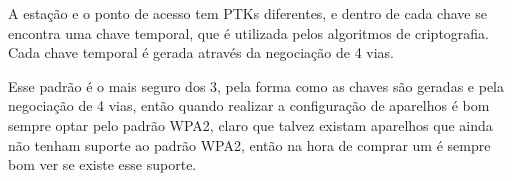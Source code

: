 A estação e o ponto de acesso tem PTKs diferentes, e dentro de cada chave se encontra uma chave temporal, que é utilizada pelos algoritmos de criptografia. Cada chave temporal é gerada através da negociação de 4 vias.

Esse padrão é o mais seguro dos 3, pela forma como as chaves são geradas e pela negociação de 4 vias, então quando realizar a configuração de aparelhos é bom sempre optar pelo padrão WPA2, claro que talvez existam aparelhos que ainda não tenham suporte ao padrão WPA2, então na hora de comprar um é sempre bom ver se existe esse suporte.